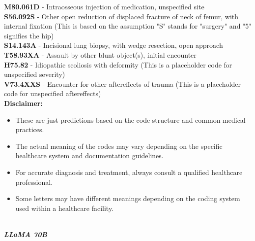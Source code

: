 \documentclass[11pt]{article}
\theoremstyle{plain}
\theoremstyle{definition}
\theoremstyle{remark}
\begin{document}
{\begin{minipage}{40em}
\textbf{M80.061D} - Intraosseous injection of medication, unspecified site\\
\textbf{S56.092S} - Other open reduction of displaced fracture of neck of femur, with internal fixation (This is based on the assumption "S" stands for "surgery" and "5" signifies the hip)\\
\textbf{S14.143A} - Incisional lung biopsy, with wedge resection, open approach\\
\textbf{T58.93XA} - Assault by other blunt object(s), initial encounter\\
\textbf{H75.82} - Idiopathic scoliosis with deformity (This is a placeholder code for unspecified severity)\\
\textbf{V73.4XXS} - Encounter for other aftereffects of trauma (This is a placeholder code for unspecified aftereffects)\\

\textbf{Disclaimer:} 

\begin{itemize}
    \item These are just predictions based on the code structure and common medical practices. 
    \item The actual meaning of the codes may vary depending on the specific healthcare system and documentation guidelines.
    \item For accurate diagnosis and treatment, always consult a qualified healthcare professional.
    \item Some letters may have different meanings depending on the coding system used within a healthcare facility. 
\end{itemize}
\end{minipage}} \\
\newpage
\textbf{\textit{LLaMA 70B}}\\
\end{document}
